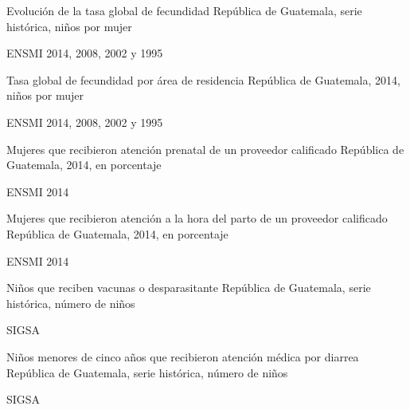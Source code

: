 
%
{%
}%
{%
	Evolución de la tasa global de fecundidad} %
{%
	República de Guatemala, serie histórica, niños por mujer} %
{%
	\begin{tikzpicture}[x=1pt,y=1pt]    \end{tikzpicture}}%
{%
	ENSMI 2014, 2008, 2002 y 1995} %


%
{%
}%
{%
	Tasa global de fecundidad por área de residencia} %
{%
	República de Guatemala, 2014, niños por mujer} %
{%
	\begin{tikzpicture}[x=1pt,y=1pt]    \end{tikzpicture}}%
{%
	ENSMI 2014, 2008, 2002 y 1995} %




%
{%
}%
{%
	Mujeres que recibieron atención prenatal de un proveedor calificado} %
{%
	República de Guatemala, 2014, en porcentaje} %
{%
	\begin{tikzpicture}[x=1pt,y=1pt]    \end{tikzpicture}}%
{%
	ENSMI 2014} %


%
{%
}%
{%
	Mujeres que recibieron atención a la hora del parto  de un proveedor calificado} %
{%
	República de Guatemala, 2014, en porcentaje} %
{%
	\begin{tikzpicture}[x=1pt,y=1pt]    \end{tikzpicture}}%
{%
	ENSMI 2014} %


%
{%
}%
{%
	Niños que reciben vacunas o desparasitante} %
{%
	República de Guatemala, serie histórica, número de niños} %
{%
	\begin{tikzpicture}[x=1pt,y=1pt]    \end{tikzpicture}}%
{%
	SIGSA} %


%
{%
}%
{%
	Niños menores de cinco años que recibieron atención médica por diarrea} %
{%
	República de Guatemala, serie histórica, número de niños} %
{%
	\begin{tikzpicture}[x=1pt,y=1pt]    \end{tikzpicture}}%
{%
	SIGSA} %

